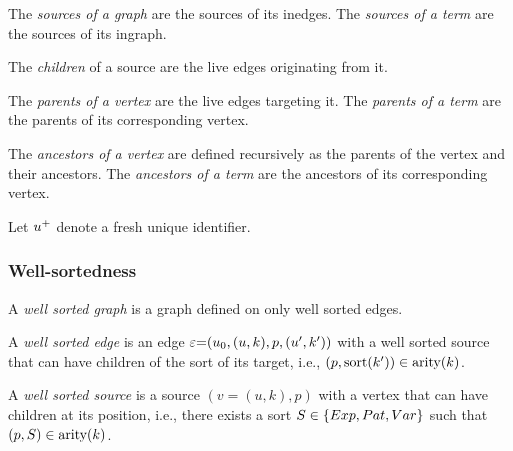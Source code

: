 \begin{definition}
  The \emph{sources of a graph} are the sources of its inedges.
  The \emph{sources of a term} are the sources of its ingraph.
\end{definition}

\begin{definition}
  The \emph{children} of a source are the live edges originating from it.
\end{definition}

\begin{definition}
  The \emph{parents of a vertex} are the live edges targeting it.
  The \emph{parents of a term} are the parents of its corresponding vertex.
\end{definition}

\begin{definition}
  The \emph{ancestors of a vertex} are defined recursively as the parents of the vertex and their ancestors.
  The \emph{ancestors of a term} are the ancestors of its corresponding vertex.
\end{definition}

Let ${u}^{+}$ denote a fresh unique identifier.


\subsubsection{Well-sortedness}

\begin{definition}
  A \emph{well sorted graph} is a graph defined on only well sorted edges.
\end{definition}

\begin{definition}
  A \emph{well sorted edge} is an edge $\varepsilon{=}(u_0, (u, k), p, (u', k'))$
  with a well sorted source that can have children of the sort of its target,
  i.e., $(p, \operatorname{\text{sort}}\mathopen{}\left(k'\right)\mathclose{}) \in \operatorname{\text{arity}}\mathopen{}\left(k\right)\mathclose{}$.
\end{definition}

\begin{definition}
  A \emph{well sorted source} is a source $(v{=}(u, k), p)$
  with a vertex that can have children at its position,
  i.e., there exists a sort $S \in \left\{Exp, Pat, Var\right\}$ such that $(p, S) \in \operatorname{\text{arity}}\mathopen{}\left(k\right)\mathclose{}$.
\end{definition}

